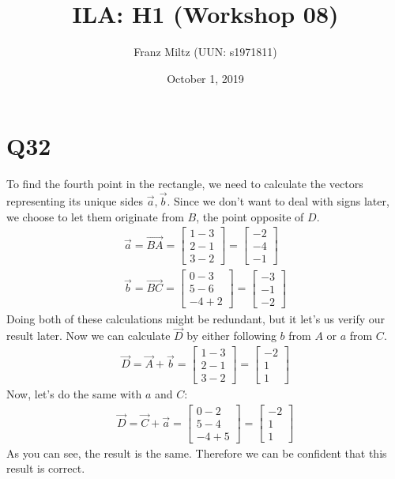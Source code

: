 \documentclass{article}
\title{ILA: H1 (Workshop 08)}
\author{Franz Miltz (UUN: s1971811)}
\date{October 1, 2019}
\begin{document}
\maketitle
\section*{Q32}
To find the fourth point in the rectangle, we need to calculate the vectors representing its unique sides $\vec a, \vec b$. Since we don't want to deal with signs later, we choose to let them originate from $B$, the point opposite of $D$.
\begin{align}
	\vec a = \vec{BA} =
	\begin{bmatrix}
		1 - 3 \\
		2 - 1 \\
		3 - 2
	\end{bmatrix} =
	\begin{bmatrix}
		-2 \\
		-4 \\
		-1
	\end{bmatrix} \\
	\vec b = \vec{BC} =
	\begin{bmatrix}
		0 - 3 \\
		5 - 6 \\
		-4 + 2
	\end{bmatrix} =
	\begin{bmatrix}
		-3 \\
		-1 \\
		-2
	\end{bmatrix}
\end{align}
Doing both of these calculations might be redundant, but it let's us verify our result later. Now we can calculate $\vec D$ by either following $b$ from $A$ or $a$ from $C$.
\begin{align}
	\vec D = \vec A + \vec b =
	\begin{bmatrix}
		1 - 3 \\
		2 - 1 \\
		3 - 2
	\end{bmatrix} =
	\begin{bmatrix}
		-2 \\
		1  \\
		1
	\end{bmatrix}
\end{align}
Now, let's do the same with $a$ and $C$:
\begin{align}
	\vec D = \vec C + \vec a =
	\begin{bmatrix}
		0 - 2 \\
		5 - 4 \\
		-4 + 5
	\end{bmatrix} =
	\begin{bmatrix}
		-2 \\
		1  \\
		1
	\end{bmatrix}
\end{align}
As you can see, the result is the same. Therefore we can be confident that this result is correct.
\end{document}
